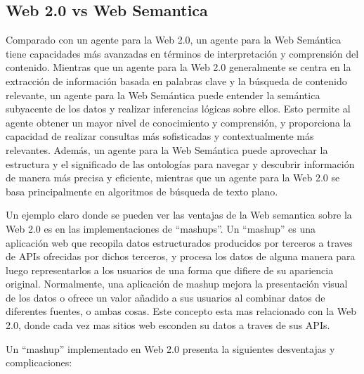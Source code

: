\subsection{Web 2.0 vs Web Semantica}
Comparado con un agente para la Web 2.0, un agente para la Web Semántica tiene capacidades más avanzadas en términos de interpretación y comprensión del contenido. Mientras que un agente para la Web 2.0 generalmente se centra en la extracción de información basada en palabras clave y la búsqueda de contenido relevante, un agente para la Web Semántica puede entender la semántica subyacente de los datos y realizar inferencias lógicas sobre ellos. Esto permite al agente obtener un mayor nivel de conocimiento y comprensión, y proporciona la capacidad de realizar consultas más sofisticadas y contextualmente más relevantes. Además, un agente para la Web Semántica puede aprovechar la estructura y el significado de las ontologías para navegar y descubrir información de manera más precisa y eficiente, mientras que un agente para la Web 2.0 se basa principalmente en algoritmos de búsqueda de texto plano.

Un ejemplo claro donde se pueden ver las ventajas de la Web semantica sobre la Web 2.0 es en las implementaciones de ``mashups''. Un ``mashup'' es una aplicación web que recopila datos estructurados producidos por terceros a traves de APIs ofrecidas por dichos terceros, y procesa los datos de alguna manera para luego representarlos a los usuarios de una forma que difiere de su apariencia original. Normalmente, una aplicación de mashup mejora la presentación visual de los datos o ofrece un valor añadido a sus usuarios al combinar datos de diferentes fuentes, o ambas cosas. Este concepto esta mas relacionado con la Web 2.0, donde cada vez mas sitios web esconden su datos a traves de sus APIs. 

Un ``mashup'' implementado en Web 2.0 presenta la siguientes desventajas y complicaciones:

